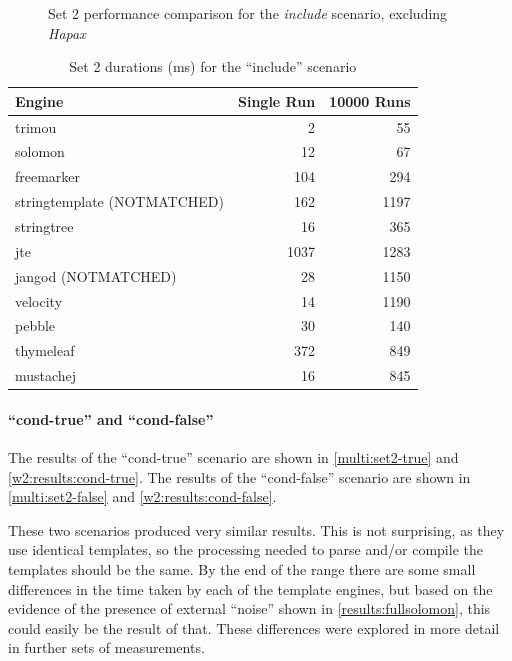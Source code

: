 \begin{figure}[!p]
\centering

\caption{\label{multi:set2-include}Set 2 performance comparison for the \emph{include} scenario, excluding \emph{Hapax}}
\end{figure}

\begin{table}[!p]
\centering
\begin{tabular}{lrr}
\textbf{Engine} & \textbf{Single Run} & \textbf{10000 Runs} \\
\hline
trimou & 2 & 55 \\
solomon & 12 & 67 \\
freemarker & 104 & 294 \\
stringtemplate (NOTMATCHED) & 162 & 1197 \\
stringtree & 16 & 365 \\
jte & 1037 & 1283 \\
jangod (NOTMATCHED) & 28 & 1150 \\
velocity & 14 & 1190 \\
pebble & 30 & 140 \\
thymeleaf & 372 & 849 \\
mustachej & 16 & 845 \\
\end{tabular}
\caption{Set 2 durations (ms) for the \enquote{include} scenario\label{w2:results:include}}
\end{table}

\paragraph{\enquote{cond-true} and \enquote{cond-false}}

The results of the \enquote{cond-true} scenario are shown in \autoref{multi:set2-true} and \autoref{w2:results:cond-true}. The results of the \enquote{cond-false} scenario are shown in \autoref{multi:set2-false} and \autoref{w2:results:cond-false}.

These two scenarios produced very similar results. This is not surprising, as they use identical templates, so the processing needed to parse and/or compile the templates should be the same. By the end of the range there are some small differences in the time taken by each of the \gls{template engine}s, but based on the evidence of the presence of external \enquote{noise} shown in \autoref{results:fullsolomon}, this could easily be the result of that. These differences were explored in more detail in further sets of measurements.

